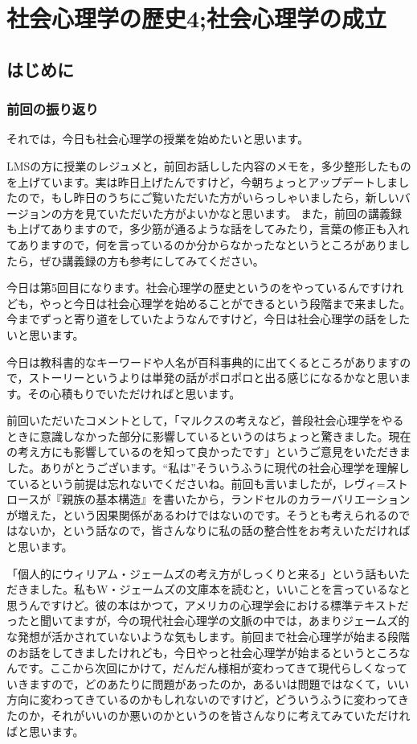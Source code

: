 \documentclass{ltjsbook}
\begin{document}
\setcounter{chapter}{4}
\chapter{社会心理学の歴史4;社会心理学の成立}
\label{sp05_history2}
\section{はじめに}

\subsection{前回の振り返り}

それでは，今日も社会心理学の授業を始めたいと思います。

LMSの方に授業のレジュメと，前回お話しした内容のメモを，多少整形したものを上げています。実は昨日上げたんですけど，今朝ちょっとアップデートしましたので，もし昨日のうちにご覧いただいた方がいらっしゃいましたら，新しいバージョンの方を見ていただいた方がよいかなと思います。
また，前回の講義録も上げてありますので，多少筋が通るような話をしてみたり，言葉の修正も入れてありますので，何を言っているのか分からなかったなというところがありましたら，ぜひ講義録の方も参考にしてみてください。

今日は第5回目になります。社会心理学の歴史というのをやっているんですけれども，やっと今日は社会心理学を始めることができるという段階まで来ました。今までずっと寄り道をしていたようなんですけど，今日は社会心理学の話をしたいと思います。

今日は教科書的なキーワードや人名が百科事典的に出てくるところがありますので，ストーリーというよりは単発の話がポロポロと出る感じになるかなと思います。その心積もりでいただければと思います。

前回いただいたコメントとして，「マルクスの考えなど，普段社会心理学をやるときに意識しなかった部分に影響しているというのはちょっと驚きました。現在の考え方にも影響しているのを知って良かったです」というご意見をいただきました。ありがとうございます。``私は''そういうふうに現代の社会心理学を理解しているという前提は忘れないでくださいね。前回も言いましたが，レヴィ=ストロースが『親族の基本構造』を書いたから，ランドセルのカラーバリエーションが増えた，という因果関係があるわけではないのです。そうとも考えられるのではないか，という話なので，皆さんなりに私の話の整合性をお考えいただければと思います。

「個人的にウィリアム・ジェームズの考え方がしっくりと来る」という話もいただきました。私もW・ジェームズの文庫本を読むと，いいことを言っているなと思うんですけど。彼の本はかつて，アメリカの心理学会における標準テキストだったと聞いてますが，今の現代社会心理学の文脈の中では，あまりジェームズ的な発想が活かされていないような気もします。前回まで社会心理学が始まる段階のお話をしてきましたけれども，今日やっと社会心理学が始まるというところなんです。ここから次回にかけて，だんだん様相が変わってきて現代らしくなっていきますので，どのあたりに問題があったのか，あるいは問題ではなくて，いい方向に変わってきているのかもしれないのですけど，どういうふうに変わってきたのか，それがいいのか悪いのかというのを皆さんなりに考えてみていただければと思います。
\end{document}

